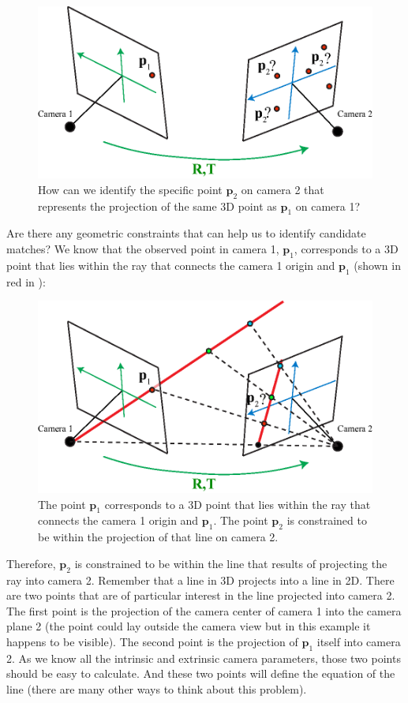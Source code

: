 \begin{figure}[h!]
    \centerline{
        \includegraphics[width=0.7\linewidth]{figures/3d_scene_understanding/epipolar_1.eps}
    }
    \caption{How can we identify the specific point $\mathbf{p}_2$ on camera 2 that represents the projection of the same 3D point as $\mathbf{p}_1$ on camera 1?}
    \label{fig:epipolar_1}
\end{figure}

Are there any geometric constraints that can help us to identify candidate matches? We know that the observed point in camera 1, $\mathbf{p}_1$, corresponds to a 3D point that lies within the ray that connects the camera 1 origin and $\mathbf{p}_1$ (shown in red in \fig{\ref{fig:epipolar_3}}):

\begin{figure}[h!]
    \centerline{
        \includegraphics[width=0.7\linewidth]{figures/3d_scene_understanding/epipolar_3.eps}
    }
    \caption{The point $\mathbf{p}_1$ corresponds to a 3D point that lies within the ray that connects the camera 1 origin and $\mathbf{p}_1$. The point $\mathbf{p}_2$ is constrained to be within the projection of that line on camera 2.}
    \label{fig:epipolar_3}
\end{figure}

Therefore, $\mathbf{p}_2$ is constrained to be within the line that results of projecting the ray into camera 2. Remember that a line in 3D projects into a line in 2D. There are two points that are of particular interest in the line projected into camera 2. The first point is the projection of the camera center of camera 1 into the camera plane 2 (the point could lay outside the camera view but in this example it happens to be visible). The second point is the projection of $\mathbf{p}_1$ itself into camera 2. As we know all the intrinsic and extrinsic camera parameters, those two points should be easy to calculate. And these two points will define the equation of the line (there are many other ways to think about this problem).



